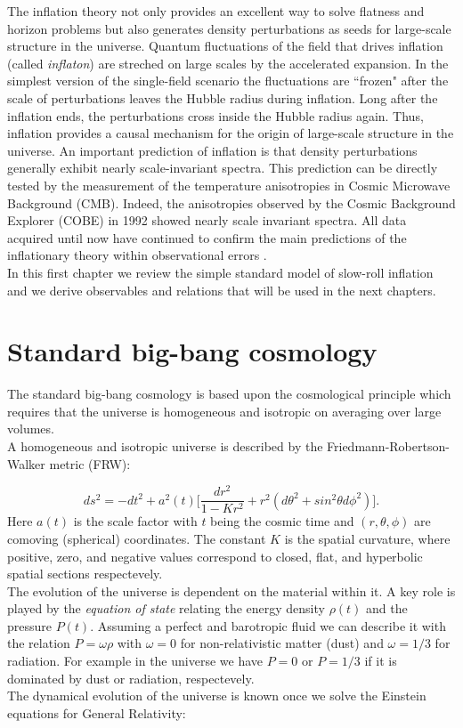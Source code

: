 \documentclass[11pt,a4paper,twoside]{book}
\begin{document}
The inflation theory not only provides an excellent way to solve flatness and horizon problems but also generates density perturbations as seeds for large-scale structure in the universe. Quantum fluctuations of the field that drives inflation (called \textit{inflaton}) are streched on large scales by the accelerated expansion. In the simplest version of the single-field scenario the fluctuations are \textquotedblleft frozen" after the scale of perturbations leaves the Hubble radius during inflation. Long after the inflation ends, the perturbations cross inside the Hubble radius again. Thus, inflation provides a causal mechanism for the origin of large-scale structure in the universe. An important prediction of inflation is that density perturbations generally exhibit nearly scale-invariant spectra. This prediction can be directly tested by the measurement of the temperature anisotropies in Cosmic Microwave Background (CMB). Indeed, the anisotropies observed by the Cosmic Background Explorer (COBE) in 1992 showed nearly scale invariant spectra. All data acquired until now have continued to confirm the main predictions of the inflationary theory within observational errors \cite{InflationDynamicsAndReheating:chap1}.\\
In this first chapter we review the simple standard model of slow-roll inflation and we derive observables and relations that will be used in the next chapters.

\section{Standard big-bang cosmology}

The standard big-bang cosmology is based upon the cosmological principle which requires that the universe is homogeneous and isotropic on averaging over large volumes.\\
A homogeneous and isotropic universe is described by the Friedmann-Robertson-Walker metric (FRW):

\begin{equation}
	\label{metric}	
	ds^{2}   = - dt^{2} + a^{2}(t)\Big[\frac{dr^{2}}{1-Kr^{2}}  +  r^{2}(d\theta^{2} + sin^{2} \theta d\phi^{2})\Big] . 
\end{equation}
Here $a(t)$ is the scale factor with $ t $ being the cosmic time and $(r,\theta,\phi) $ are comoving (spherical) coordinates. The constant $ K $ is the spatial curvature, where positive, zero, and negative values correspond to closed, flat, and hyperbolic spatial sections respectevely. \\
The evolution of the universe is dependent on the material within it. A key role is played by the \textit{equation of state} relating the energy density $ \rho (t) $ and the pressure $ P(t) $. Assuming a perfect and barotropic fluid we can describe it with the relation $ P=\omega\rho $ with $ \omega=0 $ for non-relativistic matter (dust) and $ \omega=1/3 $ for radiation.
For example in the universe we have $ P=0 $ or $ P=1/3 $ if it is dominated by dust or radiation, respectevely. \\
The dynamical evolution of the universe is known once we solve the Einstein equations for General Relativity:
\end{document}
